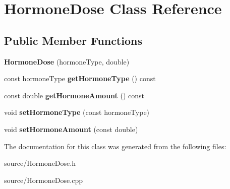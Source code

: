 \hypertarget{classHormoneDose}{}\section{Hormone\+Dose Class Reference}
\label{classHormoneDose}
\subsection*{Public Member Functions}
\begin{DoxyCompactItemize}
\item 
\mbox{\label{classHormoneDose_af265e9ca7d911eabb0f1b99e57816746}} 
{\bfseries Hormone\+Dose} (hormone\+Type, double)
\item 
\mbox{\label{classHormoneDose_abe38fb38dbba82176bf7eb55df2444de}} 
const hormone\+Type {\bfseries get\+Hormone\+Type} () const
\item 
\mbox{\label{classHormoneDose_a2141533eb1ebdf3e07ca37cee24e1e36}} 
const double {\bfseries get\+Hormone\+Amount} () const
\item 
\mbox{\label{classHormoneDose_a1ed703bddab036fcae244151f1319089}} 
void {\bfseries set\+Hormone\+Type} (const hormone\+Type)
\item 
\mbox{\label{classHormoneDose_a497e795e801b5477da8b5bcff93972da}} 
void {\bfseries set\+Hormone\+Amount} (const double)
\end{DoxyCompactItemize}


The documentation for this class was generated from the following files\+:\begin{DoxyCompactItemize}
\item 
source/Hormone\+Dose.\+h\item 
source/Hormone\+Dose.\+cpp\end{DoxyCompactItemize}
